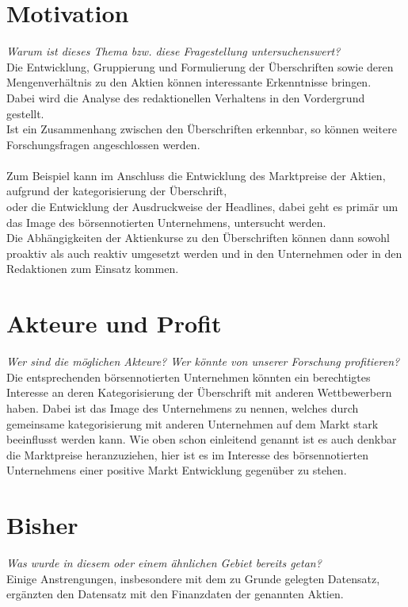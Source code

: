 \section{Motivation}
{\scriptsize \textit{Warum ist dieses Thema bzw. diese Fragestellung untersuchenswert?}}\\
Die Entwicklung, Gruppierung und Formulierung der Überschriften sowie deren Mengenverhältnis zu den Aktien können interessante Erkenntnisse bringen.\\
Dabei wird die Analyse des redaktionellen Verhaltens in den Vordergrund gestellt.\\
Ist ein Zusammenhang zwischen den Überschriften erkennbar, so können weitere Forschungsfragen angeschlossen werden.\\ \\
Zum Beispiel kann im Anschluss die Entwicklung des Marktpreise der Aktien, aufgrund der kategorisierung der Überschrift,\\ 
oder die Entwicklung der Ausdruckweise der Headlines, dabei geht es primär um das Image des börsennotierten Unternehmens, untersucht werden.\\
Die Abhängigkeiten der Aktienkurse zu den Überschriften können dann sowohl proaktiv als auch reaktiv umgesetzt werden und in den Unternehmen oder in den Redaktionen zum Einsatz kommen.


\section{Akteure und Profit}
{\scriptsize \textit{Wer sind die möglichen Akteure? Wer könnte von unserer Forschung profitieren?}}\\
Die entsprechenden börsennotierten Unternehmen könnten ein berechtigtes Interesse an deren Kategorisierung der Überschrift mit anderen Wettbewerbern haben.
Dabei ist das Image des Unternehmens zu nennen, welches durch gemeinsame kategorisierung mit anderen Unternehmen auf dem Markt stark beeinflusst werden kann.
Wie oben schon einleitend genannt ist es auch denkbar die Marktpreise heranzuziehen, hier ist es im Interesse des börsennotierten Unternehmens einer positive Markt Entwicklung gegenüber zu stehen.

\section{Bisher}
{\scriptsize \textit{Was wurde in diesem oder einem ähnlichen Gebiet bereits getan?}}\\
Einige Anstrengungen, insbesondere mit dem zu Grunde gelegten Datensatz, ergänzten den Datensatz mit den Finanzdaten der genannten Aktien.

\citep[see][]{yahoofinance}